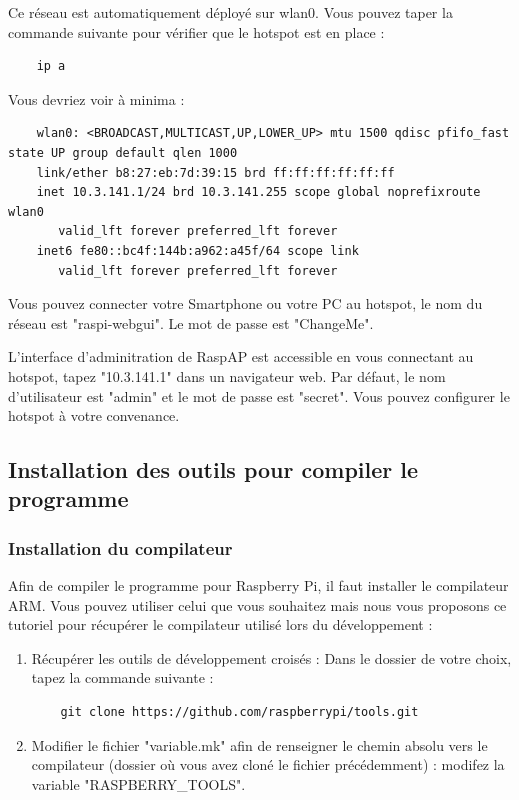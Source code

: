 Ce réseau est automatiquement déployé sur wlan0. Vous pouvez taper la commande suivante pour vérifier que le hotspot est en place : 
\vspace{-1.8\baselineskip} 
\begin{lstlisting}
    ip a
\end{lstlisting}
Vous devriez voir à minima :
\vspace{-1.8\baselineskip} 
\begin{lstlisting}
    wlan0: <BROADCAST,MULTICAST,UP,LOWER_UP> mtu 1500 qdisc pfifo_fast state UP group default qlen 1000
    link/ether b8:27:eb:7d:39:15 brd ff:ff:ff:ff:ff:ff
    inet 10.3.141.1/24 brd 10.3.141.255 scope global noprefixroute wlan0
       valid_lft forever preferred_lft forever
    inet6 fe80::bc4f:144b:a962:a45f/64 scope link 
       valid_lft forever preferred_lft forever
\end{lstlisting}

Vous pouvez connecter votre Smartphone ou votre PC au hotspot, le nom du réseau est "raspi-webgui". Le mot de passe est "ChangeMe".

L'interface d'adminitration de RaspAP est accessible en vous connectant au hotspot, tapez "10.3.141.1" dans un navigateur web. Par défaut, le nom d'utilisateur est "admin" et le mot de passe est "secret". Vous pouvez configurer le hotspot à votre convenance.

\subsection{Installation des outils pour compiler le programme {\nomLogiciel}}

\subsubsection{Installation du compilateur}

Afin de compiler le programme pour Raspberry Pi, il faut installer le compilateur ARM. Vous pouvez utiliser celui que vous souhaitez mais nous vous proposons ce tutoriel pour récupérer le compilateur utilisé lors du développement :
\begin{enumerate}
    \item Récupérer les outils de développement croisés : \newline
    Dans le dossier de votre choix, tapez la commande suivante :
\vspace{-1.8\baselineskip} 
\begin{lstlisting}
    git clone https://github.com/raspberrypi/tools.git
\end{lstlisting}
    \item Modifier le fichier "variable.mk" afin de renseigner le chemin absolu vers le compilateur (dossier où vous avez cloné le fichier précédemment) : modifez la variable "RASPBERRY\_TOOLS". \newline
\end{enumerate}

